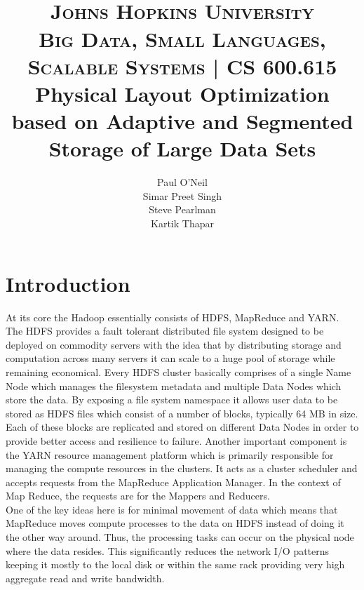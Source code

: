 \documentclass[paper=letter, fontsize=11pt]{scrartcl}
\title{
		\vspace{-1in} 	
		\usefont{OT1}{bch}{b}{n}
		\horrule{1pt} \\[0.4cm]
	    \normalfont \textsc{Johns Hopkins University \\
		Big Data, Small Languages, \\ Scalable Systems | CS 600.615} \\ [20pt]
		\huge Physical Layout Optimization\\
		based on Adaptive and Segmented Storage of Large Data Sets
		\horrule{1pt} \\[0.5cm]
}
\author{
		\normalfont
        Paul O'Neil \\
        Simar Preet Singh\\
        Steve Pearlman\\
        Kartik Thapar\\[-3pt]		\normalsize
}
\date{}
\numberwithin{equation}{section}		%
\numberwithin{figure}{section}			%
\numberwithin{table}{section}				%
\begin{document}
\maketitle




\section{Introduction}


At its core the Hadoop essentially consists of HDFS, MapReduce and YARN. The HDFS provides a fault tolerant distributed file system designed to be deployed on commodity servers with the idea that by distributing storage and computation across many servers it can scale to a huge pool of storage while remaining economical. Every HDFS cluster basically comprises of a single Name Node which manages the filesystem metadata and multiple Data Nodes which store the data. By exposing a file system namespace it allows user data to be stored as HDFS files which consist of a number of blocks, typically 64 MB in size. Each of these blocks are replicated and stored on different Data Nodes in order to provide better access and resilience to failure. Another important component is the YARN resource management platform which is primarily responsible for managing the compute resources in the clusters. It acts as a cluster scheduler and accepts requests from the MapReduce Application Manager. In the context of Map Reduce, the requests are for the Mappers and Reducers. \\

One of the key ideas here is for minimal movement of data which means that MapReduce moves compute processes to the data on HDFS instead of doing it the other way around.  Thus, the processing tasks can occur on the physical node where the data resides. This significantly reduces the network I/O patterns keeping it mostly to the local disk or within the same rack providing very high aggregate read and write bandwidth.\\
\end{document}
